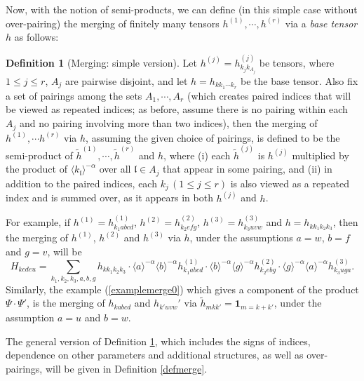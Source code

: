 \documentclass[11 pt,reqno]{amsart}
\theoremstyle{definition}
\newtheorem{df}[thm]{Definition}
\theoremstyle{remark}
\numberwithin{equation}{section}
\newcommand{\lf}{\mathfrak{l}}
\begin{document}
 Now, with the notion of semi-products, we can define (in this simple case without over-pairing) the merging of finitely many tensors $h^{(1)}, \cdots,h^{(r)}$ via a \emph{base tensor} $h$ as follows:
 \begin{df}[Merging: simple version]\label{defmerge0} Let $h^{(j)}=h_{k_jk_{A_j}}^{(j)}$ be tensors, where $1\leq j\leq r$, $A_j$ are pairwise disjoint, and let $h=h_{kk_1\cdots k_r}$ be the base tensor. Also fix a set of pairings among the sets $A_1,\cdots,A_r$ (which creates paired indices that will be viewed as repeated indices; as before, assume there is no pairing within each $A_j$ and no pairing involving more than two indices), then the merging of $h^{(1)},\cdots h^{(r)}$ via $h$, assuming the given choice of pairings, is defined to be the semi-product of $\widetilde{h}^{(1)},\cdots,\widetilde{h}^{(r)}$ and $h$, where (i) each $\widetilde{h}^{(j)}$ is $h^{(j)}$ multiplied by the product of $\langle k_\lf\rangle^{-\alpha}$ over all $\lf\in A_j$ that appear in some pairing, and (ii) in addition to the paired indices, each $k_j\,(1\leq j\leq r)$ is also viewed as a repeated index and is summed over, as it appears in both $h^{(j)}$ and $h$.
 \end{df} For example, if $h^{(1)}=h_{k_1abcd}^{(1)}$, $h^{(2)}=h_{k_2efg}^{(2)}$, $h^{(3)}=h_{k_3uvw}^{(3)}$ and $h=h_{kk_1k_2k_3}$, then the merging of $h^{(1)}$, $h^{(2)}$ and $h^{(3)}$ via $h$, under the assumptions $a=w$, $b=f$ and $g=v$, will be
\[H_{kcdeu}=\sum_{k_1,k_2,k_3,a,b,g}h_{kk_1k_2k_3}\cdot\langle a\rangle^{-\alpha}\langle b\rangle^{-\alpha}h_{k_1abcd}^{(1)}\cdot\langle b\rangle^{-\alpha}\langle g\rangle^{-\alpha}h_{k_2ebg}^{(2)}\cdot\langle g\rangle^{-\alpha}\langle a\rangle^{-\alpha}h_{k_3uga}^{(3)}.\] Similarly, the example (\ref{examplemerge0}) which gives a component of the product $\Psi\cdot\Psi'$, is the merging of $h_{kabcd}$ and $h_{k'uvw}'$ via $\widetilde{h}_{mkk'}=\mathbf{1}_{m=k+k'}$, under the assumption $a=u$ and $b=w$.

The general version of Definition \ref{defmerge0}, which includes the signs of indices, dependence on other parameters and additional structures, as well as over-pairings, will be given in Definition \ref{defmerge}.
\end{document}
